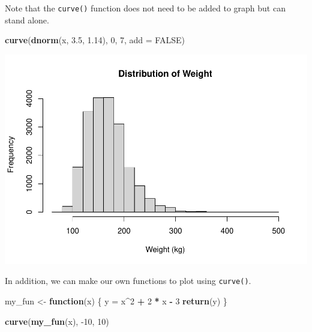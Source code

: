 \documentclass[
]{book}
\newenvironment{Shaded}{\begin{snugshade}}{\end{snugshade}}
\newcommand{\ControlFlowTok}[1]{\textcolor[rgb]{0.13,0.29,0.53}{\textbf{#1}}}
\newcommand{\DataTypeTok}[1]{\textcolor[rgb]{0.13,0.29,0.53}{#1}}
\newcommand{\DecValTok}[1]{\textcolor[rgb]{0.00,0.00,0.81}{#1}}
\newcommand{\FloatTok}[1]{\textcolor[rgb]{0.00,0.00,0.81}{#1}}
\newcommand{\KeywordTok}[1]{\textcolor[rgb]{0.13,0.29,0.53}{\textbf{#1}}}
\newcommand{\NormalTok}[1]{#1}
\newcommand{\OperatorTok}[1]{\textcolor[rgb]{0.81,0.36,0.00}{\textbf{#1}}}
\newcommand{\OtherTok}[1]{\textcolor[rgb]{0.56,0.35,0.01}{#1}}
\newcommand{\StringTok}[1]{\textcolor[rgb]{0.31,0.60,0.02}{#1}}
\begin{document}
Note that the \texttt{curve()} function does not need to be added to graph but can stand alone.

\begin{Shaded}
\begin{Highlighting}[]
\KeywordTok{curve}\NormalTok{(}\KeywordTok{dnorm}\NormalTok{(x, }\FloatTok{3.5}\NormalTok{, }\FloatTok{1.14}\NormalTok{),}
    \DecValTok{0}\NormalTok{, }\DecValTok{7}\NormalTok{, }\DataTypeTok{add =} \OtherTok{FALSE}\NormalTok{)}
\end{Highlighting}
\end{Shaded}

\includegraphics{_main_files/figure-latex/unnamed-chunk-225-1.pdf}

In addition, we can make our own functions to plot using \texttt{curve()}.

\begin{Shaded}
\begin{Highlighting}[]
\NormalTok{my_fun <-}\StringTok{ }\ControlFlowTok{function}\NormalTok{(x) \{}
\NormalTok{    y =}\StringTok{ }\NormalTok{x}\OperatorTok{^}\DecValTok{2} \OperatorTok{+}\StringTok{ }\DecValTok{2} \OperatorTok{*}\StringTok{ }\NormalTok{x }\OperatorTok{-}
\StringTok{        }\DecValTok{3}
    \KeywordTok{return}\NormalTok{(y)}
\NormalTok{\}}

\KeywordTok{curve}\NormalTok{(}\KeywordTok{my_fun}\NormalTok{(x), }\DecValTok{-10}\NormalTok{,}
    \DecValTok{10}\NormalTok{)}
\end{Highlighting}
\end{Shaded}
\end{document}
